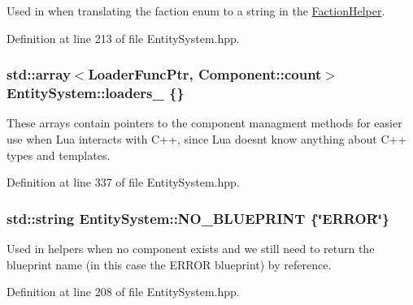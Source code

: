Used in when translating the faction enum to a string in the \hyperlink{namespace_faction_helper}{Faction\+Helper}. 



Definition at line 213 of file Entity\+System.\+hpp.

\subsubsection[{\texorpdfstring{loaders\+\_\+}{loaders_}}]{\setlength{\rightskip}{0pt plus 5cm}std\+::array$<$Loader\+Func\+Ptr, Component\+::count$>$ Entity\+System\+::loaders\+\_\+ \{\}\hspace{0.3cm}{\ttfamily [private]}}\hypertarget{class_entity_system_a9cbec81dd83f34d230c540abcdf387f4}{}\label{class_entity_system_a9cbec81dd83f34d230c540abcdf387f4}


These arrays contain pointers to the component managment methods for easier use when Lua interacts with C++, since Lua doesn\textquotesingle{}t know anything about C++ types and templates. 



Definition at line 337 of file Entity\+System.\+hpp.

\subsubsection[{\texorpdfstring{N\+O\+\_\+\+B\+L\+U\+E\+P\+R\+I\+NT}{NO_BLUEPRINT}}]{\setlength{\rightskip}{0pt plus 5cm}std\+::string Entity\+System\+::\+N\+O\+\_\+\+B\+L\+U\+E\+P\+R\+I\+NT \{\char`\"{}E\+R\+R\+OR\char`\"{}\}}\hypertarget{class_entity_system_a41e0561691509c232c26dc78c819c74e}{}\label{class_entity_system_a41e0561691509c232c26dc78c819c74e}


Used in helpers when no component exists and we still need to return the blueprint name (in this case the E\+R\+R\+OR blueprint) by reference. 



Definition at line 208 of file Entity\+System.\+hpp.

